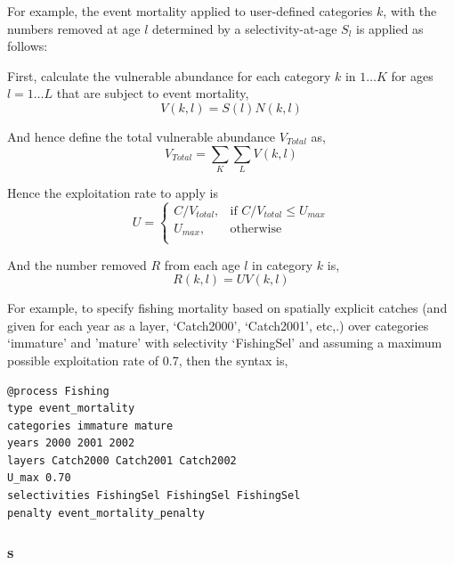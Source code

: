 For example, the event mortality applied to user-defined categories $k$, with the numbers removed at age $l$ determined by a selectivity-at-age $S_l$ is applied as follows:

First, calculate the vulnerable abundance for each category $k$ in $1 \ldots K$ for ages $l = 1 \ldots L$ that are subject to event mortality,
\begin{equation}
  V(k,l) = S(l) N(k,l)
\end{equation}

And hence define the total vulnerable abundance $V_{Total}$ as,
\begin{equation}
  V_{Total}  = \sum\limits_K {\sum\limits_L {V(k,l)}} 
\end{equation}

Hence the exploitation rate to apply is 
\begin{equation}
U = \begin{cases}
  C/V_{total}, & \text{if $C/V_{total} \leq U_{max}$} \\
  U_{max}, & \text{otherwise}\\ 
  \end{cases} 
\end{equation}

And the number removed $R$ from each age $l$ in category $k$ is,
\begin{equation}
  R(k,l) = UV(k,l)
\end{equation}

For example, to specify fishing mortality based on spatially explicit catches (and given for each year as a layer, `Catch2000', `Catch2001', etc,.) over categories `immature' and 'mature' with selectivity `FishingSel' and assuming a maximum possible exploitation rate of 0.7, then the syntax is,

\begin{verbatim}
@process Fishing
type event_mortality
categories immature mature
years 2000 2001 2002
layers Catch2000 Catch2001 Catch2002
U_max 0.70
selectivities FishingSel FishingSel FishingSel
penalty event_mortality_penalty
\end{verbatim}


\subsubsection{s}

